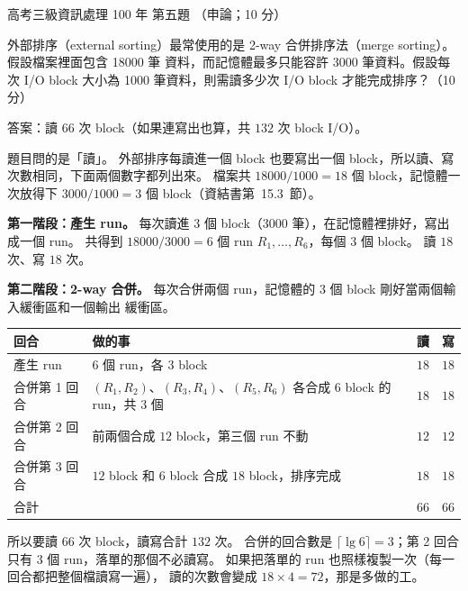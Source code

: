 \begin{pastexam}[label={px:gk3-100-ds-05}]{高考三級資訊處理 100 年 第五題}
（申論；10 分）

外部排序（external sorting）最常使用的是 2-way 合併排序法（merge sorting）。假設檔案裡面包含 18000 筆
資料，而記憶體最多只能容許 3000 筆資料。假設每次 I/O block 大小為 1000 筆資料，則需讀多少次 I/O block
才能完成排序？（10 分）
\end{pastexam}

\begin{pastsoln}
答案：讀 $66$ 次 block（如果連寫出也算，共 $132$ 次 block I/O）。

題目問的是「讀」。 外部排序每讀進一個 block 也要寫出一個 block，所以讀、寫次數相同，下面兩個數字都列出來。
檔案共 $18000 / 1000 = 18$ 個 block，記憶體一次放得下 $3000 / 1000 = 3$ 個 block（資結書第~15.3~節）。

\textbf{第一階段：產生 run。} 每次讀進 $3$ 個 block（$3000$ 筆），在記憶體裡排好，寫出成一個 run。
共得到 $18000 / 3000 = 6$ 個 run $R_1, \dots, R_6$，每個 $3$ 個 block。 讀 $18$ 次、寫 $18$ 次。

\textbf{第二階段：2-way 合併。} 每次合併兩個 run，記憶體的 $3$ 個 block 剛好當兩個輸入緩衝區和一個輸出
緩衝區。
\begin{center}
\begin{tabular}{llcc}
\toprule
回合 & 做的事 & 讀 & 寫 \\
\midrule
產生 run & $6$ 個 run，各 $3$ block & $18$ & $18$ \\
合併第 1 回合 & $(R_1,R_2)$、$(R_3,R_4)$、$(R_5,R_6)$ 各合成 $6$ block 的 run，共 $3$ 個 & $18$ & $18$ \\
合併第 2 回合 & 前兩個合成 $12$ block，第三個 run 不動 & $12$ & $12$ \\
合併第 3 回合 & $12$ block 和 $6$ block 合成 $18$ block，排序完成 & $18$ & $18$ \\
\midrule
合計 & & $66$ & $66$ \\
\bottomrule
\end{tabular}
\end{center}
所以要讀 $66$ 次 block，讀寫合計 $132$ 次。 合併的回合數是 $\lceil \lg 6 \rceil = 3$；第 2 回合只有
$3$ 個 run，落單的那個不必讀寫。 如果把落單的 run 也照樣複製一次（每一回合都把整個檔讀寫一遍），
讀的次數會變成 $18 \times 4 = 72$，那是多做的工。
\end{pastsoln}
